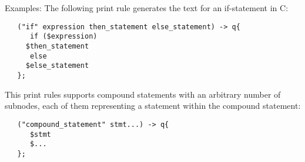 \begin{grammar}
      \produces \lextoken{\$}  \\
      \produces \lextoken{\$}
	 \lextoken{\{}  \lextoken{\}} \\
      \produces {}
\end{grammar}

\noindent
Examples: The following print rule generates the text for an
if-statement in C:

\begin{lstlisting}
   ("if" expression then_statement else_statement) -> q{
      if ($expression)
	 $then_statement
      else
	 $else_statement
   };
\end{lstlisting}

\noindent
This print rules supports compound statements with an arbitrary
number of subnodes, each of them representing a statement within
the compound statement:

\begin{lstlisting}
   ("compound_statement" stmt...) -> q{
      $stmt
      $...
   };
\end{lstlisting}

\endinput
